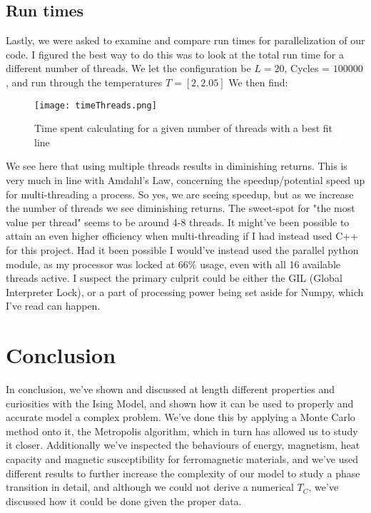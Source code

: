 \documentclass{article}
\begin{document}
\subsection*{Run times}
Lastly, we were asked to examine and compare run times for parallelization of our code. I figured the best way to do this was to look at the total run time for a different number of threads.
\newline We let the configuration be $L = 20$, Cycles = $100000$, and run through the temperatures $T = [2, 2.05]$
\newline We then find:
\begin{figure}[ht!]
    \centering
    \texttt{[image: timeThreads.png]}
    \caption{Time spent calculating for a given number of threads with a best fit line}
    \label{fig3}
\end{figure} \newline
We see here that using multiple threads results in diminishing returns. This is very much in line with Amdahl's Law\cite{amdahl}, concerning the speedup/potential speed up for multi-threading a process. \newline
So yes, we are seeing speedup, but as we increase the number of threads we see diminishing returns. The sweet-spot for "the most value per thread" seems to be around 4-8 threads. \newline
It might've been possible to attain an even higher efficiency when multi-threading if I had instead used C++ for this project. Had it been possible I would've instead used the parallel python module, as my processor was locked at 66\% usage, even with all 16 available threads active. I suspect the primary culprit could be either the GIL (Global Interpreter Lock), or a part of processing power being set aside for Numpy, which I've read can happen. \newpage
\section{Conclusion}
In conclusion, we've shown and discussed at length different properties and curiosities with the Ising Model, and shown how it can be used to properly and accurate model a complex problem. We've done this by applying a Monte Carlo method onto it, the Metropolis algorithm, which in turn has allowed us to study it closer. Additionally we've inspected the behaviours of energy, magnetism, heat capacity and magnetic susceptibility for ferromagnetic materials, and we've used different results to further increase the complexity of our model to study a phase transition in detail, and although we could not derive a numerical $T_C$, we've discussed how it could be done given the proper data.


\newpage
\end{document}
